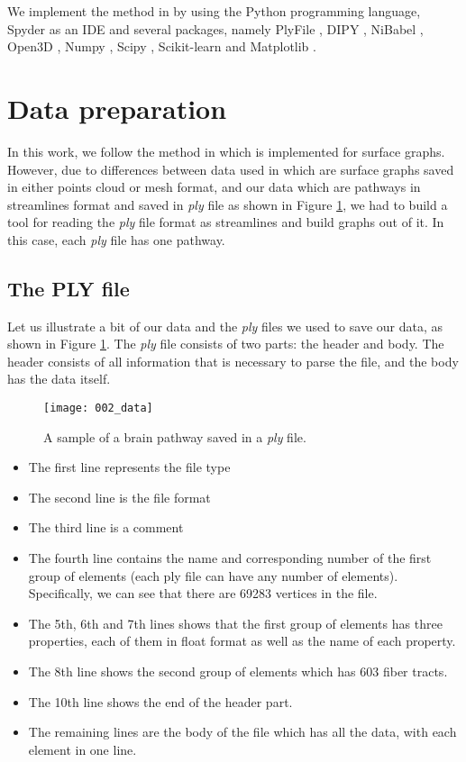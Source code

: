 \documentclass[../structure.tex]{subfiles}
\begin{document}
We implement the method in \cite{Amberg2007} by using the Python programming language, Spyder as an IDE \cite{spyder} and several packages, namely PlyFile \cite{plyfile}, DIPY \cite{nipy}, NiBabel \cite{nipy}, Open3D \cite{Zhou2018}, Numpy \cite{numpy}, Scipy \cite{scipy}, Scikit-learn \cite{sklearn} and Matplotlib \cite{matplotlib}.

\section{Data preparation}
\hspace{2em}In this work, we follow the method in \cite{Amberg2007} which is implemented for surface graphs. However, due to differences between data used in \cite{Amberg2007} which are surface graphs saved in either points cloud or mesh format, and our data which are pathways in streamlines format and saved in \textit{ply} file as shown in Figure \ref{fig:data}, we had to build a tool for reading the \textit{ply} file format as streamlines and build graphs out of it. In this case, each \textit{ply} file has one pathway.

\subsection{The PLY file}
\hspace{2em}Let us illustrate a bit of our data and the \textit{ply} files we used to save our data, as shown in Figure \ref{fig:data}. The \textit{ply} file consists of two parts: the header and body. The header consists of all information that is necessary to parse the file, and the body has the data itself.

\begin{figure}[h!]
\centering
\texttt{[image: 002\_data]}
\captionsetup{justification=centering}
\caption{A sample of a brain pathway saved in a \textit{ply} file.}
\label{fig:data}
\end{figure}

\begin{itemize}
\item The first line represents the file type
\item The second line is the file format
\item The third line is a comment
\item The fourth line contains the name and corresponding number of the first group of elements (each ply file can have any number of elements). Specifically, we can see that there are 69283 vertices in the file.
\item The 5th, 6th and 7th lines shows that the first group of elements has three properties, each of them in float format as well as  the name of each property.
\item The 8th line shows the second group of elements which has 603 fiber tracts.
\item The 10th line shows the end of the header part.
\item The remaining lines are the body of the file which has all the data, with each element in one line.
\end{itemize}
\end{document}
